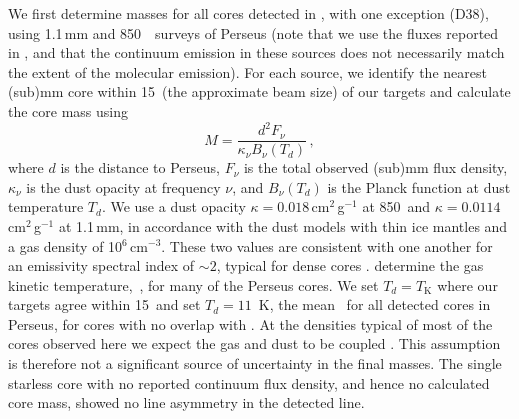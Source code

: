 \documentclass[iop,twocolappendix]{emulateapj}
\begin{document}
We first determine masses for all cores detected in {\HCO}, with one exception (D38), using 1.1\,mm \citep{Enoch2006} and 850\,\micron~\citep{Kirk2006} surveys of Perseus (note that we use the fluxes reported in \citealt{Kirk07e}, and that the continuum emission in these sources does not necessarily match the extent of the molecular emission). For each source, we identify the nearest (sub)mm core within 15\arcsec\ (the approximate beam size) of our targets and calculate the core mass using
%
\begin{equation}
\label{eq:mass_estimate}
M = \frac{d^2 F_\nu}{\kappa_\nu B_\nu (T_d)} \, ,
\end{equation}
%
where $d$ is the distance to Perseus, $F_\nu$ is the total observed (sub)mm flux density, $\kappa_\nu$ is the dust opacity at frequency $\nu$, and $B_\nu (T_d)$ is the Planck function at dust temperature $T_d$. We use a dust opacity $\kappa = 0.018$\,cm$^2$\,g$^{-1}$ at 850\,{\micron} and $\kappa = 0.0114$\,cm$^2$\,g$^{-1}$ at 1.1\,mm, in accordance with the \citet{ossen94} dust models with thin ice mantles and a gas density of 10$^6$\,cm$^{-3}$. These two values are consistent with one another for an emissivity spectral index of $\sim 2$, typical for dense cores \citep{Schnee2010}. \citet{Rosolowsky2008} determine the gas kinetic temperature, \tk\,, for many of the Perseus cores. We set $T_d = T_\mathrm{K}$ where our targets agree within 15\arcsec\ and set $T_d = 11$~K, the mean \tk\ for all detected cores in Perseus, for cores with no overlap with \citeauthor{Rosolowsky2008}. At the densities typical of most of the cores observed here \citep[$n \gtrsim 10^{4.5}$\,cm$^{-3}$;][]{Kirk2006,Enoch2006} we expect the gas and dust to be coupled \citep{doty97,goldsmith01}. This assumption is therefore not a significant source of uncertainty in the final masses. The single starless core with no reported continuum flux density, and hence no calculated core mass, showed no line asymmetry in the detected {\HCO} line. 
\end{document}
